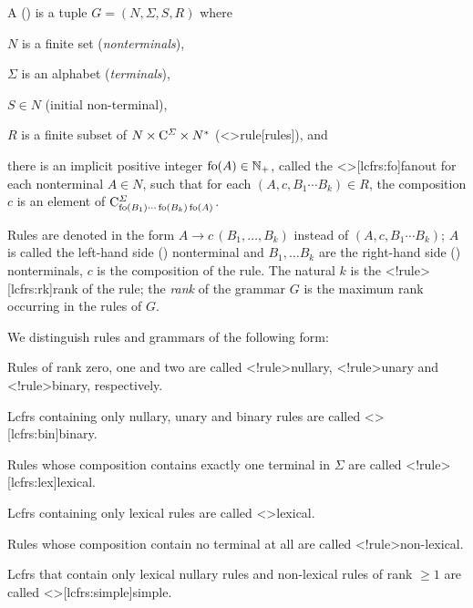 \documentclass[../document.tex]{subfiles}
\begin{document}
    \begin{definition}
        A  ()%
        is a tuple \(G=(N, \varSigma, S, R)\) where
        \begin{compactenum}[(i)]
            \item \(N\) is a finite set (\emph{nonterminals}),
            \item \(\varSigma\) is an alphabet (\emph{terminals}),
            \item \(S \in N\) (initial non-terminal),
            \item \(R\) is a finite subset of \(N \times \mathrm{C}^\varSigma \times N^*\) (<\lcfrs>{rule}[rules]), and
            \item there is an implicit positive integer \(\operatorname{fo}(A) \in \mathbb{N}_+\), called the <\lcfrs>[lcfrs:fo]{fanout} for each nonterminal \(A \in N\), such that
            for each \((A, c, B_1\cdots B_k) \in R\), the  composition \(c\) is an element of \(\mathrm{C}^\varSigma_{\operatorname{fo}(B_1) \cdots \operatorname{fo}(B_k) \operatorname{fo}(A)}\).
        \end{compactenum}

        Rules are denoted in the form \(A \to c\,(B_1, \ldots, B_k)\) instead of \((A, c, B_1 \cdots B_k)\); \(A\) is called the left-hand side () nonterminal and \(B_1, \ldots B_k\) are the right-hand side () nonterminals, \(c\) is the composition of the rule.
        The natural \(k\) is the <\lcfrs!rule>[lcfrs:rk]{rank} of the rule; the \emph{rank} of the grammar \(G\) is the maximum rank occurring in the rules of \(G\).
    \end{definition}

    \begin{definition}
        We distinguish rules and grammars of the following form:
        \begin{compactitem}
            \item Rules of rank zero, one and two are called <\lcfrs!rule>{nullary}, <\lcfrs!rule>{unary} and <\lcfrs!rule>{binary}, respectively.
            \item Lcfrs containing only nullary, unary and binary rules are called <\lcfrs>[lcfrs:bin]{binary}.
            \item Rules whose composition contains exactly one terminal in \(\varSigma\) are called <\lcfrs!rule>[lcfrs:lex]{lexical}.
            \item Lcfrs containing only lexical rules are called <\lcfrs>{lexical}.
            \item Rules whose composition contain no terminal at all are called <\lcfrs!rule>{non-lexical}.
            \item Lcfrs that contain only lexical nullary rules and non-lexical rules of rank \(\ge 1\) are called <\lcfrs>[lcfrs:simple]{simple}.
        \end{compactitem}
    \end{definition}
\end{document}
